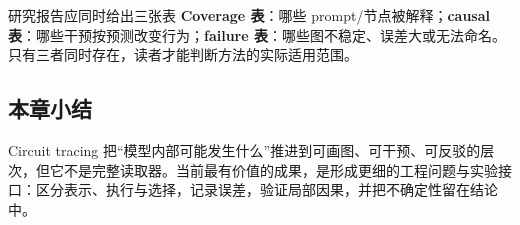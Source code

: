 
\begin{knowledgebox}{研究报告应同时给出三张表}
\textbf{Coverage 表}：哪些 prompt/节点被解释；\textbf{causal 表}：哪些干预按预测改变行为；\textbf{failure 表}：哪些图不稳定、误差大或无法命名。只有三者同时存在，读者才能判断方法的实际适用范围。
\end{knowledgebox}

\subsection{本章小结}

Circuit tracing 把“模型内部可能发生什么”推进到可画图、可干预、可反驳的层次，但它不是完整读取器。当前最有价值的成果，是形成更细的工程问题与实验接口：区分表示、执行与选择，记录误差，验证局部因果，并把不确定性留在结论中。

